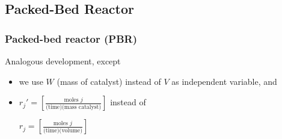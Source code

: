 % 
% 
% 

\subsection{Packed-Bed Reactor}
\begin{frame}\frametitle{Packed-bed reactor (PBR)}
	Analogous development, except
	\begin{itemize}
		\item	we use $W$ (mass of catalyst) instead of $V$ as independent variable, and
		\item	$r_j' = \left[\frac{\text{moles }j}{\text{(time)(mass catalyst)}}\right]$ instead of

		$r_j =\left[\frac{\text{moles }j}{\text{(time)(volume)}}\right]$
	\end{itemize}
\end{frame}

